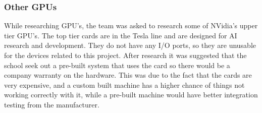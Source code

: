     \subsubsection*{Other GPUs}

        While researching GPU's, the team was asked to research some of NVidia's upper tier GPU's.  The top tier cards are in the Tesla line and are designed for AI research and development.  They do not have any I/O ports, so they are unusable for the devices related to this project.  After research it was suggested that the school seek out a pre-built system that uses the card so there would be a company warranty on the hardware.  This was due to the fact that the cards are very expensive, and a custom built machine has a higher chance of things not working correctly with it, while a pre-built machine would have better integration testing from the manufacturer.